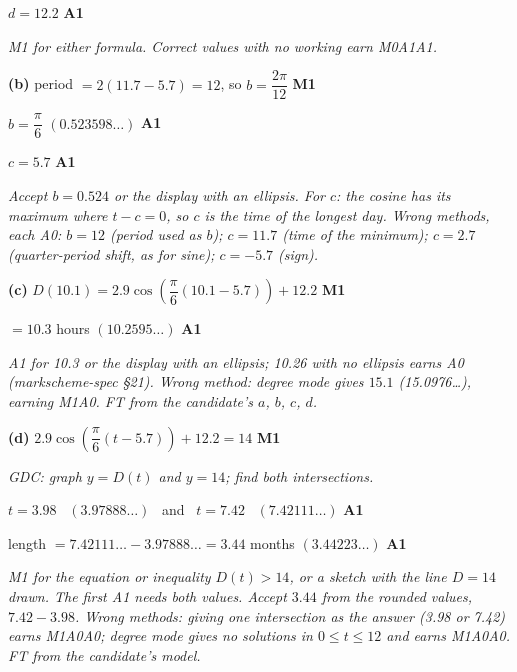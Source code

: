 \documentclass[12pt, twoside]{article}
\begin{document}
\begin{enumerate}[itemsep=0.3cm]
$d = 12.2$ \hfill \textbf{A1}

\emph{M1 for either formula. Correct values with no working earn M0A1A1.}

\textbf{(b)} period $= 2(11.7 - 5.7) = 12$, so $b = \dfrac{2\pi}{12}$
\hfill \textbf{M1}

$b = \dfrac{\pi}{6}$ \quad $(0.523598\ldots)$ \hfill \textbf{A1}

$c = 5.7$ \hfill \textbf{A1}

\emph{Accept $b = 0.524$ or the display with an ellipsis. For $c$: the
cosine has its maximum where $t - c = 0$, so $c$ is the time of the longest
day. Wrong methods, each A0: $b = 12$ (period used as $b$); $c = 11.7$
(time of the minimum); $c = 2.7$ (quarter-period shift, as for sine);
$c = -5.7$ (sign).}

\textbf{(c)} $D(10.1) = 2.9\cos\left(\dfrac{\pi}{6}(10.1 - 5.7)\right) + 12.2$
\hfill \textbf{M1}

$= 10.3$ hours \quad $(10.2595\ldots)$ \hfill \textbf{A1}

\emph{A1 for 10.3 or the display with an ellipsis; 10.26 with no
ellipsis earns A0 (markscheme-spec \S21). Wrong method: degree mode gives
$15.1$ (15.0976\ldots), earning M1A0. FT from the candidate's $a$, $b$,
$c$, $d$.}

\textbf{(d)} $2.9\cos\left(\dfrac{\pi}{6}(t - 5.7)\right) + 12.2 = 14$
\hfill \textbf{M1}

\textit{GDC: graph $y = D(t)$ and $y = 14$; find both intersections.}

$t = 3.98$ \ $(3.97888\ldots)$ \ and \ $t = 7.42$ \ $(7.42111\ldots)$
\hfill \textbf{A1}

length $= 7.42111\ldots - 3.97888\ldots = 3.44$ months
\quad $(3.44223\ldots)$ \hfill \textbf{A1}

\emph{M1 for the equation or inequality $D(t) > 14$, or a sketch with the
line $D = 14$ drawn. The first A1 needs both values. Accept $3.44$ from
the rounded values, $7.42 - 3.98$. Wrong methods: giving one intersection
as the answer (3.98 or 7.42) earns M1A0A0; degree mode gives no solutions
in $0 \le t \le 12$ and earns M1A0A0. FT from the candidate's model.}

\end{enumerate}
\end{document}
